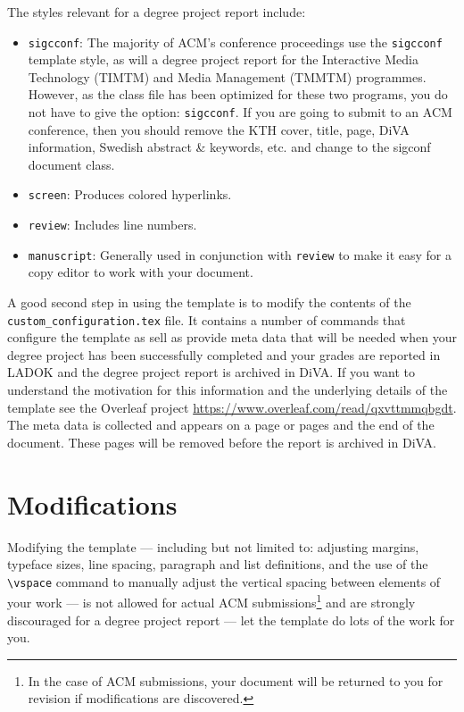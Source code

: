 \documentclass[manuscript, screen]{timtm}
\begin{document}
The styles relevant for a degree project report include:
\begin{itemize}
\item {\verb|sigcconf|}: The majority of ACM's conference proceedings use the {\verb|sigcconf|} template style, as will a degree project report for the Interactive Media Technology (TIMTM) and Media Management (TMMTM) programmes. However, as the class file has been optimized for these two programs, you do not have to give the option: {\verb|sigcconf|}. If you are going to submit to an ACM conference, then you should remove the KTH cover, title, page, DiVA information, Swedish abstract \& keywords, etc. and change to the sigconf document class.
\item {\verb|screen|}: Produces colored hyperlinks.
\item {\verb|review|}: Includes line numbers.
\item {\verb|manuscript|}: Generally used in conjunction with \verb|review| to make it easy for a copy editor to work with your document.
\end{itemize}

A good second step in using the template is to modify the contents of the \texttt{custom\_configuration.tex} file. It contains a number of commands that configure the template as sell as provide meta data that will be needed when your degree project has been successfully completed and your grades are reported in LADOK and the degree project report is archived in DiVA. If you want to understand the motivation for this information and the underlying details of the template see the Overleaf project \url{https://www.overleaf.com/read/qxvttmmqbgdt}. The meta data is collected and appears on a page or pages and the end of the document. These pages will be removed before the report is archived in DiVA.

\section{Modifications}

Modifying the template --- including but not limited to: adjusting
margins, typeface sizes, line spacing, paragraph and list definitions,
and the use of the \verb|\vspace| command to manually adjust the
vertical spacing between elements of your work --- is not allowed for actual ACM submissions\footnote{In the case of ACM submissions, your document will be returned to you for revision if modifications are discovered.} and are strongly discouraged for a degree project report --- let the template do lots of the work for you.
\end{document}
